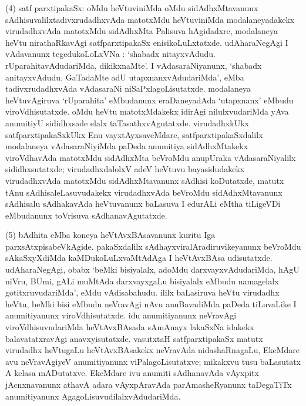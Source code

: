 (4) satf parxtipakaSx: oMdu heVtuviniMda oMdu sidAdhxMtavanunx sAdhisuvalilx\break tadivx\-rudadhxvAda matotxMdu heVtuviniMda modalaneyadakekx virudadhxvAda matotxMdu sidAdhxMta Palisuva hAgidadxre, modalaneya heVtu nirathaRkavAgi satfparxtipakaSx enisi\-koLuLxtatxde. udAharaNegAgi I vAdavanunx tegedukoLoLxVNa : `shabadx nitayxvAdudu. rUparahitavAdudariMda, dikikxnaMte'. I vAdasaraNiyanunx, `shabadx anitayxvAdudu, GaTadaMte adU utapxnanxvAdudariMda', eMba tadivxrudadhxvAda vAdasaraNi niSaPxlagoLisutatxde. modalaneya heVtuvAgiruva `rUparahita' eMbudanunx eraDaneyadAda \hbox{`utapxnanx'} eMbudu viroVdhisutatxde. oMdu heVtu matotxMdakekx idirAgi nilulxvudariMda yAva anumitiyU sididhxsade elalx taTasathxvAgutatxde. virudadhxkUkx satfparxtipakaSxkUkx Enu vayxtAyxsa\-veMdare, satfparxtipakaSxdalilx modalaneya vAdasaraNiyiMda paDeda anumitiya sidAdhxM\-takekx viroVdhavAda matotxMdu sidAdhxMta beVroMdu anupUraka vAdasaraNiyalilx sididhx\-sutatxde; virudadhxdalolxV adeV heVtuvu bayasidudakekx virudadhxvAda matotxMdu sidAdhxMta\-vanunx sAdhisi koDutatxde, matutx tAnu sAdhisaleLasuvudakekx virudadhxvAda beVroMdu sidAdhxMtavanunx sAdhisalu sAdhakavAda heVtuvanunx baLasuva I edurALi eMtha tiLigeVDi eMbudanunx toVrisuva sAdhanavAgutatxde.

(5) bAdhita eMba koneya heVtAvxBAsavanunx kuritu Iga parxsAtxpisabeVkAgide. pakaSxdalilx sAdhayxviralAradiruvikeyanunx beVroMdu sAkaSxyXdiMda kaMDukoLuLxvaMtAdAga I heVtAvxBAsa udisutatxde. udAharaNegAgi, obabx `beMki bisiyalalx, adoMdu darxvayx\-vAdudariMda, hAgU niVru, BUmi, gALi muMtAda darxvayxgaLu bisiyalalx eMbudu namagelalx gotitxruvudariMda', eMdu vAdisabahudu. ililx baLasiruva heVtu \hbox{virudadhx} heVtu, beMki bisi eMbudu neVravAgi nAvu anuBavadiMda paDeda tiLuvaLike I anu\-mitiyanunx viroVdhisutatxde. idu anumitiyanunx neVravAgi viroVdhisuvu\-dariMda heVtAvxBAsada sAmAnayx lakaSxNa idakekx balavatatxravAgi anavxyisutatxde. vasutxtaH satf\-parxtipakaSx matutx virudadhx heVtugaLu heVtAvxBAsakekx neVravAda nidashaRnagaLu, EkeMdare avu neVra\-vAgiyeV anumitiyanunx viPalagoLisutatxve; mikakxvu tusu baLasutatx A kelasa mADu\-tatxve. EkeMdare ivu anumiti sAdhanavAda vAyxpitx jAcnxnavanunx athavA adara vAyxpAra\-vAda parAmasheRyanunx taDegaTiTx anumitiyanunx AgagoLisuvudilalxvAdudariMda.

